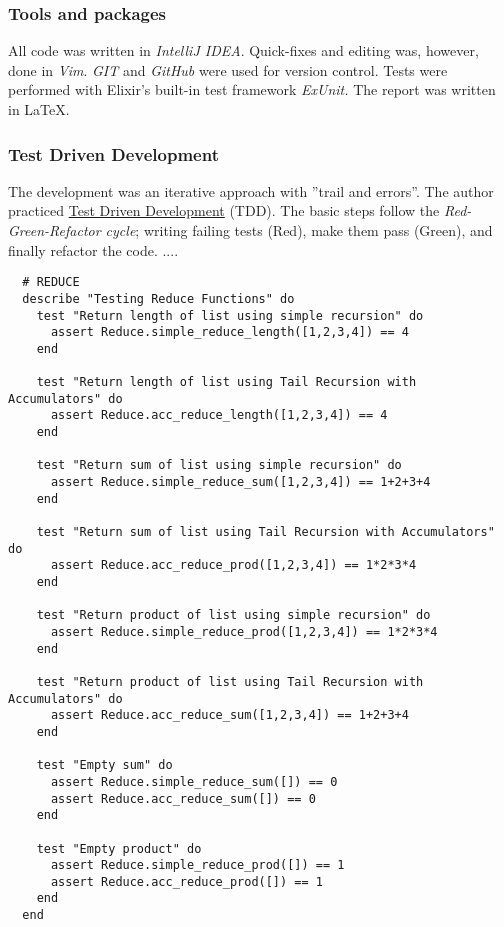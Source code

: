 \documentclass[a4paper,11pt]{article}
\begin{document}
\subsubsection*{Tools and packages}
\label{subsec:tools}
All code was written in \emph{IntelliJ IDEA}.
Quick-fixes and editing was, however, done in \emph{Vim}.
\emph{GIT} and \emph{GitHub} were used for version control.
Tests were performed with Elixir's built-in test framework \emph{ExUnit.}
The report was written in \LaTeX.

\subsubsection*{Test Driven Development}
\label{subsec:ttd}
The development was an iterative approach with ''trail and errors''.
The author practiced
\href{https://www.elixirwiki.com/wiki/Test-Driven_Development_in_Elixir}{Test Driven Development}
(TDD).
The basic steps follow the \emph{Red-Green-Refactor cycle};
writing failing tests (Red), make them pass (Green),
and finally refactor the code.
....

\begin{verbatim}
  # REDUCE
  describe "Testing Reduce Functions" do
    test "Return length of list using simple recursion" do
      assert Reduce.simple_reduce_length([1,2,3,4]) == 4
    end

    test "Return length of list using Tail Recursion with Accumulators" do
      assert Reduce.acc_reduce_length([1,2,3,4]) == 4
    end

    test "Return sum of list using simple recursion" do
      assert Reduce.simple_reduce_sum([1,2,3,4]) == 1+2+3+4
    end

    test "Return sum of list using Tail Recursion with Accumulators" do
      assert Reduce.acc_reduce_prod([1,2,3,4]) == 1*2*3*4
    end

    test "Return product of list using simple recursion" do
      assert Reduce.simple_reduce_prod([1,2,3,4]) == 1*2*3*4
    end

    test "Return product of list using Tail Recursion with Accumulators" do
      assert Reduce.acc_reduce_sum([1,2,3,4]) == 1+2+3+4
    end

    test "Empty sum" do
      assert Reduce.simple_reduce_sum([]) == 0
      assert Reduce.acc_reduce_sum([]) == 0
    end

    test "Empty product" do
      assert Reduce.simple_reduce_prod([]) == 1
      assert Reduce.acc_reduce_prod([]) == 1
    end
  end
\end{verbatim}
\end{document}
